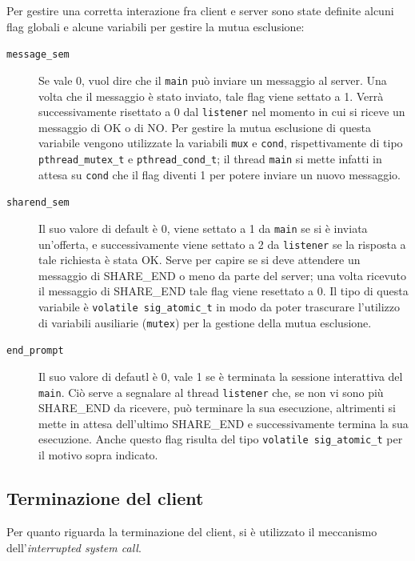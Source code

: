 \documentclass[a4paper,10pt]{article}
\begin{document}
Per gestire una corretta interazione fra client e server sono state definite alcuni flag globali e alcune variabili per gestire la mutua esclusione:

\begin{description}
	\item[\texttt{message\_sem}] Se vale 0, vuol dire che il \texttt{main} pu\`o inviare un messaggio al server. Una volta che il messaggio \`e stato inviato, tale flag viene settato a 1. Verr\`a successivamente risettato a 0 dal \texttt{listener} nel momento in cui si riceve un messaggio di OK o di NO. Per gestire la mutua esclusione di questa variabile vengono utilizzate la variabili \texttt{mux} e \texttt{cond}, rispettivamente di tipo \texttt{pthread\_mutex\_t} e \texttt{pthread\_cond\_t}; il thread \texttt{main} si mette infatti in attesa su \texttt{cond} che il flag diventi 1 per potere inviare un nuovo messaggio.

	\item[\texttt{sharend\_sem}] Il suo valore di default \`e 0, viene settato a 1 da \texttt{main} se si \`e inviata un'offerta, e successivamente viene settato a 2 da \texttt{listener} se la risposta a tale richiesta \`e stata OK. Serve per capire se si deve attendere un messaggio di SHARE\_END o meno da parte del server; una volta ricevuto il messaggio di SHARE\_END tale flag viene resettato a 0. Il tipo di questa variabile \`e \texttt{volatile sig\_atomic\_t} in modo da poter trascurare l'utilizzo di variabili ausiliarie (\texttt{mutex}) per la gestione della mutua esclusione.
	
	\item[\texttt{end\_prompt}] Il suo valore di defautl \`e 0, vale 1 se \`e terminata la sessione interattiva del \texttt{main}. Ci\`o serve a segnalare al thread \texttt{listener} che, se non vi sono pi\`u SHARE\_END da ricevere, pu\`o terminare la sua esecuzione, altrimenti si mette in attesa dell'ultimo SHARE\_END e successivamente termina la sua esecuzione. Anche questo flag risulta del tipo \texttt{volatile sig\_atomic\_t} per il motivo sopra indicato.
	
\end{description}

\subsection{Terminazione del client}

Per quanto riguarda la terminazione del client, si \`e utilizzato il meccanismo dell'\emph{interrupted system call}.
\end{document}
